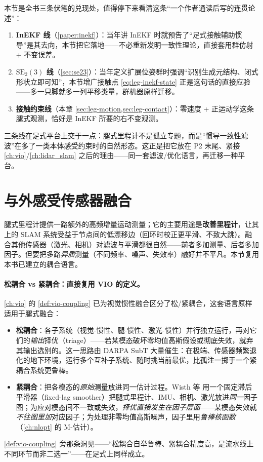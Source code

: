 \begin{insight}\label{ins:leg-three-lines}
本节是全书三条伏笔的兑现处，值得停下来看清这条“一个作者通读后写的连贯论述”：
\begin{enumerate}
  \item \textbf{InEKF 线}（\cref{paper:inekf}）：当年讲 InEKF 时就预告了“足式接触辅助惯导”是其去向，本节把它落地——不必重新发明一致性理论，直接套用群仿射 + 不变误差。
  \item \textbf{$\mathrm{SE}_2(3)$ 线}（\cref{sec:se23}）：当年定义扩展位姿群时强调“识别生成元结构、闭式形状立即可知”，本节增广接触点 \cref{eq:leg-inekf-state} 正是这句话的直接应验——多一只脚就多一列平移类量，群机器原样迁移。
  \item \textbf{接触约束线}（本章 \cref{sec:leg-motion,sec:leg-contact}）：零速度 + 正运动学这条腿式观测，恰好是 InEKF 所要的右不变观测。
\end{enumerate}
三条线在足式平台上交于一点：腿式里程计不是孤立专题，而是“惯导一致性滤波”在多了一类本体感受约束时的自然形态。这正是把它放在 P2 末尾、紧接 \cref{ch:vio}/\cref{ch:lidar_slam} 之后的理由——同一套滤波/优化语言，再迁移一种平台。
\end{insight}

\section{与外感受传感器融合}
\label{sec:leg-fusion}

腿式里程计提供一路额外的高频增量运动测量；它的主要用途是\textbf{改善里程计}，让其上的 SLAM 系统受益于节点间的低漂移边（回环时校正更平滑、不致大跳）。融合其他传感器（激光、相机）对滤波与平滑都很自然——前者多加测量、后者多加因子。但要把多路\emph{异质}测量（不同频率、噪声、失效率）融好并不平凡。本节复用本书已建立的耦合语言。

\paragraph{松耦合 vs 紧耦合：直接复用 VIO 的定义。}
\cref{ch:vio} 的 \cref{def:vio-coupling} 已为视觉惯性融合区分了松/紧耦合，这套语言原样适用于腿式融合：
\begin{itemize}
  \item \textbf{松耦合}：各子系统（视觉-惯性、腿-惯性、激光-惯性）并行独立运行，再对它们的\emph{输出}择优（triage）——若某模态破坏零均值高斯假设或彻底失效，就弃其输出选别的。这一思路由 DARPA SubT 大量催生\cite{carlone2026handbook}：在极端、传感器频繁退化的地下环境，运行多个互补子系统、随时挑当前最优，比孤注一掷于一个紧耦合系统更鲁棒。
  \item \textbf{紧耦合}：把各模态的\emph{原始}测量放进同一估计过程。Wisth 等\cite{wisth2023vilens} 用一个固定滞后平滑器（fixed-lag smoother）把腿式里程计、IMU、相机、激光放进\emph{同一}因子图；为应对模态间不一致或失效，\emph{择优直接发生在因子层面}——某模态失效就\emph{不往图里加}对应因子；为处理非零均值高斯噪声，因子里用\emph{鲁棒核函数}（\cref{ch:nlopt} 的 M-估计）。
\end{itemize}
\cref{def:vio-coupling} 旁那条洞见——“松耦合自举鲁棒、紧耦合精度高，是流水线上不同环节而非二选一”——在足式上同样成立。

